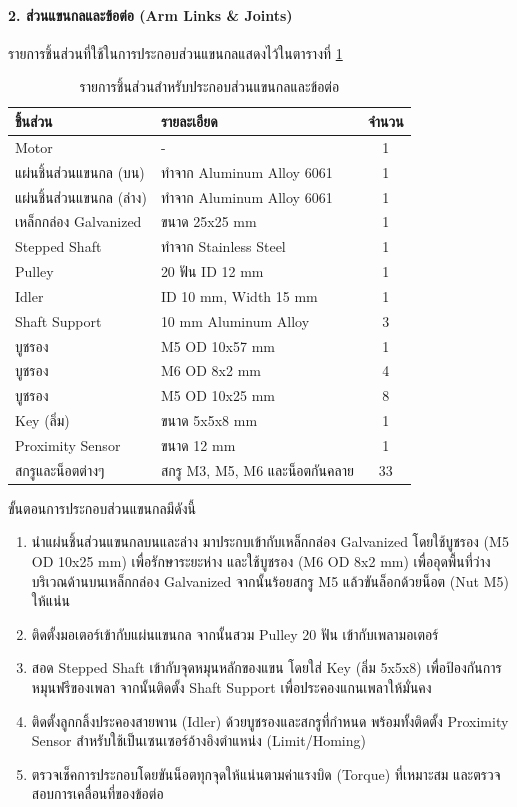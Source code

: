\paragraph{2. ส่วนแขนกลและข้อต่อ (Arm Links \& Joints)}
\label{sec:arm_assembly}
รายการชิ้นส่วนที่ใช้ในการประกอบส่วนแขนกลแสดงไว้ในตารางที่ \ref{tab:arm_parts}

\begin{table}[H]
\centering
\caption{รายการชิ้นส่วนสำหรับประกอบส่วนแขนกลและข้อต่อ}
\label{tab:arm_parts}
\begin{tabular}{llc}
\toprule
ชิ้นส่วน & รายละเอียด & จำนวน \\
\midrule
Motor & - & 1 \\
แผ่นชิ้นส่วนแขนกล (บน) & ทำจาก Aluminum Alloy 6061 & 1 \\
แผ่นชิ้นส่วนแขนกล (ล่าง) & ทำจาก Aluminum Alloy 6061 & 1 \\
เหล็กกล่อง Galvanized & ขนาด 25x25 mm & 1 \\
Stepped Shaft & ทำจาก Stainless Steel & 1 \\
Pulley & 20 ฟัน ID 12 mm & 1 \\
Idler & ID 10 mm, Width 15 mm & 1 \\
Shaft Support & 10 mm Aluminum Alloy & 3 \\
บูชรอง & M5 OD 10x57 mm & 1 \\
บูชรอง & M6 OD 8x2 mm & 4 \\
บูชรอง & M5 OD 10x25 mm & 8 \\
Key (ลิ่ม) & ขนาด 5x5x8 mm & 1 \\
Proximity Sensor & ขนาด 12 mm & 1 \\
สกรูและน็อตต่างๆ & สกรู M3, M5, M6 และน็อตกันคลาย & 33 \\
\bottomrule
\end{tabular}
\end{table}

ขั้นตอนการประกอบส่วนแขนกลมีดังนี้
\begin{enumerate}
    \item นำแผ่นชิ้นส่วนแขนกลบนและล่าง มาประกบเข้ากับเหล็กกล่อง Galvanized โดยใช้บูชรอง (M5 OD 10x25 mm) เพื่อรักษาระยะห่าง และใช้บูชรอง (M6 OD 8x2 mm) เพื่ออุดพื้นที่ว่างบริเวณด้านบนเหล็กกล่อง Galvanized จากนั้นร้อยสกรู M5 แล้วขันล็อกด้วยน็อต (Nut M5) ให้แน่น
    \item ติดตั้งมอเตอร์เข้ากับแผ่นแขนกล จากนั้นสวม Pulley 20 ฟัน เข้ากับเพลามอเตอร์
    \item สอด Stepped Shaft เข้ากับจุดหมุนหลักของแขน โดยใส่ Key (ลิ่ม 5x5x8) เพื่อป้องกันการหมุนฟรีของเพลา จากนั้นติดตั้ง Shaft Support เพื่อประคองแกนเพลาให้มั่นคง
    \item ติดตั้งลูกกลิ้งประคองสายพาน (Idler) ด้วยบูชรองและสกรูที่กำหนด พร้อมทั้งติดตั้ง Proximity Sensor สำหรับใช้เป็นเซนเซอร์อ้างอิงตำแหน่ง (Limit/Homing)
    \item ตรวจเช็คการประกอบโดยขันน็อตทุกจุดให้แน่นตามค่าแรงบิด (Torque) ที่เหมาะสม และตรวจสอบการเคลื่อนที่ของข้อต่อ
\end{enumerate}

